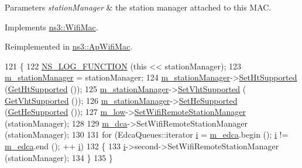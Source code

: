 \begin{DoxyParams}{Parameters}
{\em station\+Manager} & the station manager attached to this M\+AC. \\
\hline
\end{DoxyParams}


Implements \hyperlink{classns3_1_1WifiMac_ac6d1b335852aaf941389722df50fcd78}{ns3\+::\+Wifi\+Mac}.



Reimplemented in \hyperlink{classns3_1_1ApWifiMac_ae3c3d4faab6d3a50f7a776cc493a5465}{ns3\+::\+Ap\+Wifi\+Mac}.


\begin{DoxyCode}
121 \{
122   \hyperlink{log-macros-disabled_8h_a90b90d5bad1f39cb1b64923ea94c0761}{NS\_LOG\_FUNCTION} (\textcolor{keyword}{this} << stationManager);
123   \hyperlink{classns3_1_1RegularWifiMac_a76d1a5e27b64bfe36f24a55d1eea2775}{m\_stationManager} = stationManager;
124   \hyperlink{classns3_1_1RegularWifiMac_a76d1a5e27b64bfe36f24a55d1eea2775}{m\_stationManager}->\hyperlink{classns3_1_1WifiRemoteStationManager_a9078e641b9b16f237974d07d37d88af9}{SetHtSupported} (\hyperlink{classns3_1_1RegularWifiMac_a533990b906e4fd7b6852e6d124701eb2}{GetHtSupported} ());
125   \hyperlink{classns3_1_1RegularWifiMac_a76d1a5e27b64bfe36f24a55d1eea2775}{m\_stationManager}->\hyperlink{classns3_1_1WifiRemoteStationManager_a149cf907f831f80e22162624a01f6c1a}{SetVhtSupported} (
      \hyperlink{classns3_1_1RegularWifiMac_afc1f3e8ba1d594c0a8716f8471e9da7a}{GetVhtSupported} ());
126   \hyperlink{classns3_1_1RegularWifiMac_a76d1a5e27b64bfe36f24a55d1eea2775}{m\_stationManager}->\hyperlink{classns3_1_1WifiRemoteStationManager_a18c218db519ceb78e910b6184a4e2992}{SetHeSupported} (\hyperlink{classns3_1_1RegularWifiMac_a8c3bcca7041c4dc4c6d8b4651549ad98}{GetHeSupported} ());
127   \hyperlink{classns3_1_1RegularWifiMac_a726ce0ade9bb7e6b7d81cd397f32dbde}{m\_low}->\hyperlink{classns3_1_1MacLow_a8151fd0fa31a7034f86aa65b3e4973fa}{SetWifiRemoteStationManager} (stationManager);
128 
129   \hyperlink{classns3_1_1RegularWifiMac_a152965c3def1a308b088b37c2c88a1a2}{m\_dca}->SetWifiRemoteStationManager (stationManager);
130 
131   \textcolor{keywordflow}{for} (EdcaQueues::iterator \hyperlink{bernuolliDistribution_8m_a6f6ccfcf58b31cb6412107d9d5281426}{i} = \hyperlink{classns3_1_1RegularWifiMac_ac750365ab3708902cc0b7700164c706d}{m\_edca}.begin (); \hyperlink{bernuolliDistribution_8m_a6f6ccfcf58b31cb6412107d9d5281426}{i} != \hyperlink{classns3_1_1RegularWifiMac_ac750365ab3708902cc0b7700164c706d}{m\_edca}.end (); ++
      \hyperlink{bernuolliDistribution_8m_a6f6ccfcf58b31cb6412107d9d5281426}{i})
132     \{
133       \hyperlink{bernuolliDistribution_8m_a6f6ccfcf58b31cb6412107d9d5281426}{i}->second->SetWifiRemoteStationManager (stationManager);
134     \}
135 \}
\end{DoxyCode}


